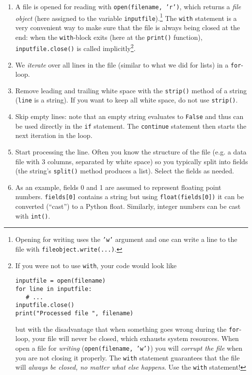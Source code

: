 \documentclass[letterpaper]{scrartcl}
\begin{document}
\begin{enumerate}
\item A file is opened for reading with \texttt{open(filename, 'r')},
  which returns a \emph{file object} (here assigned to the variable
  \texttt{inputfile}).\footnote{Opening for writing uses the
    \texttt{'w'} argument and one can write a line to the file with
    \texttt{fileobject.write(...)}.} The
  \texttt{with} statement is a very convenient way to make
  sure that the file is always being closed at the end: when the
  \texttt{with}-block exits (here at the
  \texttt{print()} function),
  \texttt{inputfile.close()} is called
  implicitly\cprotect\footnote{If you were not to use \texttt{with},
    your code would look like
\begin{verbatim}
inputfile = open(filename)
for line in inputfile:
   # ...
inputfile.close()
print("Processed file ", filename)
\end{verbatim}
    but with the disadvantage that when something goes wrong during
    the \texttt{for}-loop, your file will never be closed, which
    exhausts system resources. When open a file for \emph{writing}
    (\texttt{open(filename, 'w')}) you will \emph{corrupt the file}
    when you are not closing it properly. The \texttt{with} statement
    guarantees that the file will \emph{always be closed, no matter
      what else happens}. Use the \texttt{with} statement!}.
\item We \emph{iterate} over all lines in the file (similar to what we
  did for lists) in a \texttt{for}-loop.
\item Remove leading and trailing white space with the
  \texttt{strip()} method of a string (\texttt{line} is a string). If
  you want to keep all white space, do not use \texttt{strip()}.
\item Skip empty lines: note that an empty string evaluates to
  \texttt{False} and thus can be used directly in the \texttt{if}
  statement. The \texttt{continue} statement then starts the next
  iteration in the loop.
\item Start processing the line. Often you know the structure of the
  file (e.g. a data file with 3 columns, separated by white space) so
  you typically split into fields (the string's \texttt{split()}
  method produces a list). Select the fields as needed.
\item As an example, fields 0 and 1 are assumed to represent floating
  point numbers. \texttt{fields[0]} contains a string but using
  \texttt{float(fields[0])} it can be converted (``cast'') to a Python
  float. Similarly, integer numbers can be cast with \texttt{int()}.
\end{enumerate}
\end{document}
